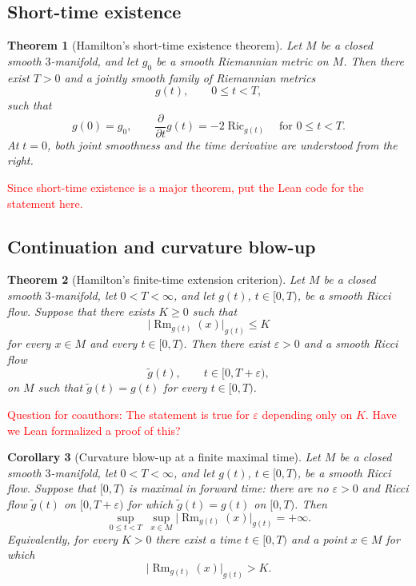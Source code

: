 \documentclass[10pt]{coll-l}
\newtheorem{theorem}{Theorem}[chapter]
\newtheorem{corollary}[theorem]{Corollary}
\theoremstyle{definition}
\theoremstyle{remark}
\numberwithin{section}{chapter}
\numberwithin{equation}{chapter}
\newcommand{\Ric}{\operatorname{Ric}}
\newcommand{\Rm}{\operatorname{Rm}}
\begin{document}
\subsection{Short-time existence}

\begin{theorem}[Hamilton's short-time existence theorem]
\label{thm:short-time-existence}
Let $M$ be a closed smooth $3$-manifold, and let $g_{0}$ be a smooth
Riemannian metric on $M$.  Then there exist $T>0$ and a jointly smooth family
of Riemannian metrics
\[
  g(t),\qquad 0\leq t<T,
\]
such that
\[
  g(0)=g_{0},
  \qquad
  \frac{\partial}{\partial t}g(t)=-2\Ric_{g(t)}
  \quad\text{for }0\leq t<T.
\]
At $t=0$, both joint smoothness and the time derivative are understood from
the right.
\end{theorem}

\textcolor{red}{Since short-time existence is a major theorem, put the Lean code for the statement here.}

\subsection{Continuation and curvature blow-up}

\begin{theorem}[Hamilton's finite-time extension criterion]
\label{thm:bounded-curvature-extension}
Let $M$ be a closed smooth $3$-manifold, let $0<T<\infty$, and let $g(t)$,
$t\in[0,T)$, be a smooth Ricci flow.  Suppose that there exists $K\geq0$ such
that
\[
  \bigl|\Rm_{g(t)}(x)\bigr|_{g(t)}\leq K
\]
for every $x\in M$ and every $t\in[0,T)$.  Then there exist
$\varepsilon>0$ and a smooth Ricci flow
\[
  \widetilde g(t),\qquad t\in[0,T+\varepsilon),
\]
on $M$ such that $\widetilde g(t)=g(t)$ for every $t\in[0,T)$.
\end{theorem}

\textcolor{red}{Question for coauthors: The statement is true for $\varepsilon$ depending only on $K$. Have we Lean formalized a proof of this?}

\begin{corollary}[Curvature blow-up at a finite maximal time]
\label{cor:finite-time-curvature-blowup}
Let $M$ be a closed smooth $3$-manifold, let $0<T<\infty$, and let $g(t)$,
$t\in[0,T)$, be a smooth Ricci flow.  Suppose that $[0,T)$ is maximal in
forward time: there are no $\varepsilon>0$ and Ricci flow
$\widetilde g(t)$ on $[0,T+\varepsilon)$ for which
$\widetilde g(t)=g(t)$ on $[0,T)$.  Then
\[
  \sup_{0\leq t<T}\ \sup_{x\in M}
  \bigl|\Rm_{g(t)}(x)\bigr|_{g(t)}
  =+\infty.
\]
Equivalently, for every $K>0$ there exist a time $t\in[0,T)$ and a point
$x\in M$ for which
\[
  \lvert\Rm_{g(t)}(x)\rvert_{g(t)}>K.
\]
\end{corollary}
\end{document}
